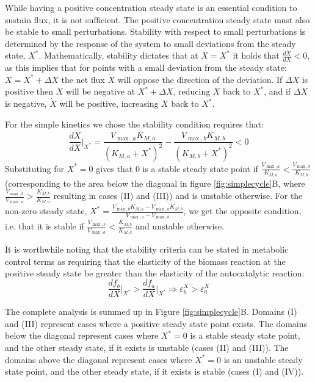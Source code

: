 \documentclass[a4page,notitlepage]{article}
\begin{document}
    While having a positive concentration steady state is an essential condition to sustain flux, it is not sufficient.
    The positive concentration steady state must also be stable to small perturbations.
    Stability with respect to small perturbations is determined by the response of the system to small deviations from the steady state, $X^*$.
    Mathematically, stability dictates that at $X=X^*$ it holds that $\frac{d\dot X}{dX} <0$, as this  implies that for points with a small deviation from the steady state: $X = X^*+\Delta X$ the net flux $\dot X$ will oppose the direction of the deviation.
    If $\Delta X$ is positive then $\dot X$ will be negative at $X^*+\Delta X$, reducing $X$ back to $X^*$, and if $\Delta X$ is negative, $\dot X$ will be positive, increasing $X$ back to $X^*$.

    For the simple kinetics we chose the stability condition requires that:
    \begin{equation*}
      \frac{d\dot X}{dX}\Big\vert_{X^*} = \frac{V_{\max,a}K_{M,a}}{(K_{M,a}+X^*)^2}-\frac{V_{\max,b}K_{M,b}}{(K_{M,b}+X^*)^2}<0
    \end{equation*}
    Substituting for $X^*=0$ gives that $0$ is a stable steady state point if $\frac{V_{\max,a}}{K_{M,a}}<\frac{V_{\max,b}}{K_{M,b}}$ (corresponding to the area below the diagonal in figure \ref{fig:simplecycle}B, where $\frac{V_{\max,b}}{V_{\max,a}}>\frac{K_{M,b}}{K_{M,a}}$ resulting in cases (II) and (III)) and is unstable otherwise.
    For  the non-zero steady state, $X^*=\frac{V_{\max,b}K_{M,a}-V_{\max,a}K_{M,b}}{V_{\max,a}-V_{\max,b}}$, we get the opposite condition, i.e. that it is stable if $\frac{V_{\max,b}}{V_{\max,a}}<\frac{K_{M,b}}{K_{M,a}}$ and unstable otherwise.

    It is worthwhile noting that the stability criteria can be stated in metabolic control terms \cite{Fell1997-bp} as requiring that the elasticity of the biomass reaction at the positive steady state be greater than the elasticity of the autocatalytic reaction:
    \begin{equation*}
      \frac{df_b}{dX}\Big\vert_{X^*}>\frac{df_a}{dX}\Big\vert_{X^*} \Rightarrow \varepsilon^X_b>\varepsilon^X_a
    \end{equation*}
    
    The complete analysis is summed up in Figure \ref{fig:simplecycle}B.
    Domains (I) and (III) represent cases where a positive steady state point exists.
    The domains below the diagonal represent cases where $X^*=0$ is a stable steady state point, and the other steady state, if it exists is unstable (cases (II) and (III)).
    The domains above the diagonal represent cases where $X^*=0$ is an unstable steady state point, and the other steady state, if it exists is stable (cases (I) and (IV)).
\end{document}
